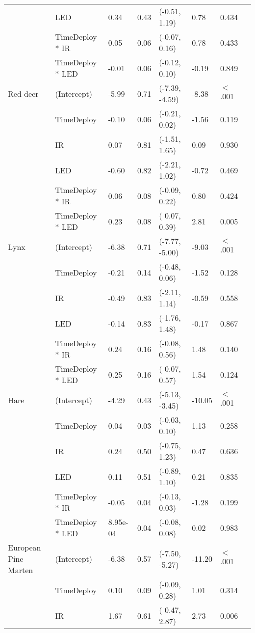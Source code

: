\begin{table}[ht]
\begin{tabular}{llllllll}
   & LED & 0.34 & 0.43 & (-0.51,  1.19) & 0.78 & 0.434  \\ 
   & TimeDeploy * IR & 0.05 & 0.06 & (-0.07,  0.16) & 0.78 & 0.433  \\ 
   & TimeDeploy * LED & -0.01 & 0.06 & (-0.12,  0.10) & -0.19 & 0.849  \\ 
  Red deer & (Intercept) & -5.99 & 0.71 & (-7.39, -4.59) & -8.38 & $<$ .001 \\ 
   & TimeDeploy & -0.10 & 0.06 & (-0.21,  0.02) & -1.56 & 0.119  \\ 
   & IR & 0.07 & 0.81 & (-1.51,  1.65) & 0.09 & 0.930  \\ 
   & LED & -0.60 & 0.82 & (-2.21,  1.02) & -0.72 & 0.469  \\ 
   & TimeDeploy * IR & 0.06 & 0.08 & (-0.09,  0.22) & 0.80 & 0.424  \\ 
   & TimeDeploy * LED & 0.23 & 0.08 & ( 0.07,  0.39) & 2.81 & 0.005  \\ 
  Lynx & (Intercept) & -6.38 & 0.71 & (-7.77, -5.00) & -9.03 & $<$ .001 \\ 
   & TimeDeploy & -0.21 & 0.14 & (-0.48,  0.06) & -1.52 & 0.128  \\ 
   & IR & -0.49 & 0.83 & (-2.11,  1.14) & -0.59 & 0.558  \\ 
   & LED & -0.14 & 0.83 & (-1.76,  1.48) & -0.17 & 0.867  \\ 
   & TimeDeploy * IR & 0.24 & 0.16 & (-0.08,  0.56) & 1.48 & 0.140  \\ 
   & TimeDeploy * LED & 0.25 & 0.16 & (-0.07,  0.57) & 1.54 & 0.124  \\ 
  Hare & (Intercept) & -4.29 & 0.43 & (-5.13, -3.45) & -10.05 & $<$ .001 \\ 
   & TimeDeploy & 0.04 & 0.03 & (-0.03,  0.10) & 1.13 & 0.258  \\ 
   & IR & 0.24 & 0.50 & (-0.75,  1.23) & 0.47 & 0.636  \\ 
   & LED & 0.11 & 0.51 & (-0.89,  1.10) & 0.21 & 0.835  \\ 
   & TimeDeploy * IR & -0.05 & 0.04 & (-0.13,  0.03) & -1.28 & 0.199  \\ 
   & TimeDeploy * LED & 8.95e-04 & 0.04 & (-0.08,  0.08) & 0.02 & 0.983  \\ 
  European Pine Marten & (Intercept) & -6.38 & 0.57 & (-7.50, -5.27) & -11.20 & $<$ .001 \\ 
   & TimeDeploy & 0.10 & 0.09 & (-0.09,  0.28) & 1.01 & 0.314  \\ 
   & IR & 1.67 & 0.61 & ( 0.47,  2.87) & 2.73 & 0.006  \\ 

\end{tabular}
\end{table}
